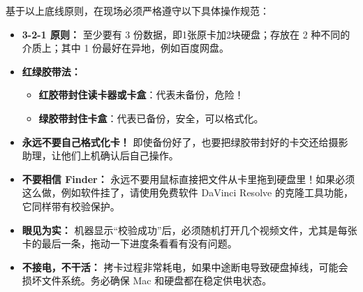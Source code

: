 \documentclass[10pt, a5paper]{article}
\begin{document}
基于以上底线原则，在现场必须严格遵守以下具体操作规范：
\begin{itemize}
    \item \textbf{3-2-1 原则：} 至少要有 3 份数据，即1张原卡加2块硬盘；存放在 2 种不同的介质上；其中 1 份最好在异地，例如百度网盘。
    \item \textbf{红绿胶带法：}
    \begin{itemize}
        \item \textcolor{AlertRed}{\textbf{红胶带封住读卡器或卡盒}}：代表未备份，危险！
        \item \textcolor{SafeGreen}{\textbf{绿胶带封住卡盒}}：代表已备份，安全，可以格式化。
    \end{itemize}
    \item \textbf{永远不要自己格式化卡！} 即使备份好了，也要把绿胶带封好的卡交还给摄影助理，让他们上机确认后自己操作。
    \item \textbf{不要相信 Finder：} 永远不要用鼠标直接把文件从卡里拖到硬盘里！如果必须这么做，例如软件挂了，请使用免费软件 DaVinci Resolve 的克隆工具功能，它同样带有校验保护。
    \item \textbf{眼见为实：} 机器显示“校验成功”后，必须随机打开几个视频文件，尤其是每张卡的最后一条，拖动一下进度条看看有没有问题。
    \item \textbf{不接电，不干活：} 拷卡过程非常耗电，如果中途断电导致硬盘掉线，可能会损坏文件系统。务必确保 Mac 和硬盘都在稳定供电状态。
\end{itemize}
\newpage
\thispagestyle{empty} %
\end{document}
